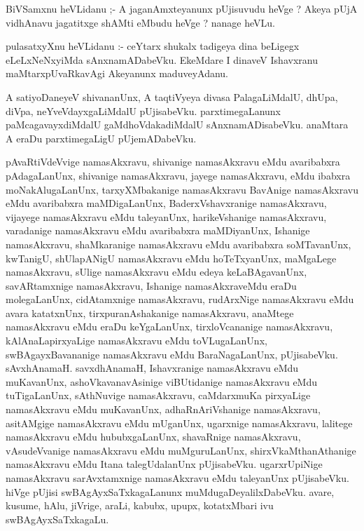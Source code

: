\documentclass{article}
\begin{document}
\begin{mn}
BiVSamxnu  heVLidanu ;- A  jaganAmxteyanunx  pUjisuvudu  heVge ?  Akeya  pUjA  vidhAnavu  jagatitxge  
shAMti  eMbudu  heVge ?  nanage  heVLu.
\end{mn}

\begin{mn}
pulasatxyXnu  heVLidanu :- ceYtarx  shukalx  tadigeya  dina  beLigegx  eLeLxNeNxyiMda  sAnxnamADabeVku.  
EkeMdare  I  dinaveV  Ishavxranu  maMtarxpUvaRkavAgi  Akeyanunx  maduveyAdanu.
\end{mn}

\begin{mn}
A  satiyoDaneyeV  shivananUnx,  A  taqtiVyeya  divasa  PalagaLiMdalU,  dhUpa,  diVpa,  
neYveVdayxgaLiMdalU  pUjisabeVku.  parxtimegaLanunx  paMcagavayxdiMdalU  gaMdhoVdakadiMdalU  
sAnxnamADisabeVku.  anaMtara  A  eraDu  parxtimegaLigU  pUjemADabeVku.
\end{mn}

\begin{mn}
pAvaRtiVdeVvige  namasAkxravu,  shivanige  namasAkxravu  eMdu  avaribabxra   pAdagaLanUnx,  
shivanige  namasAkxravu,  jayege  namasAkxravu,  eMdu  ibabxra  moNakAlugaLanUnx,  tarxyXMbakanige  
namasAkxravu  BavAnige  namasAkxravu  eMdu  avaribabxra  maMDigaLanUnx,  BaderxVshavxranige  
namasAkxravu,  vijayege  namasAkxravu  eMdu  taleyanUnx,  harikeVshanige  namasAkxravu,  varadanige  
namasAkxravu  eMdu  avaribabxra  maMDiyanUnx,  Ishanige  namasAkxravu,  shaMkaranige  namasAkxravu  
eMdu  avaribabxra  soMTavanUnx,  kwTanigU,  shUlapANigU  namasAkxravu  eMdu  hoTeTxyanUnx,  maMgaLege  
namasAkxravu,  sUlige  namasAkxravu  eMdu  edeya  keLaBAgavanUnx,  savARtamxnige  namasAkxravu,  
Ishanige  namasAkxraveMdu  eraDu  molegaLanUnx,  cidAtamxnige  namasAkxravu,  rudArxNige  namasAkxravu  
eMdu  avara  katatxnUnx,  tirxpuranAshakanige  namasAkxravu,  anaMtege  namasAkxravu  eMdu  eraDu  
keYgaLanUnx,  tirxloVcananige  namasAkxravu,  kAlAnaLapirxyaLige  namasAkxravu  eMdu  toVLugaLanUnx,  
swBAgayxBavananige  namasAkxravu  eMdu  BaraNagaLanUnx,  pUjisabeVku.  sAvxhAnamaH.  savxdhAnamaH,  
Ishavxranige  namasAkxravu  eMdu  muKavanUnx,  ashoVkavanavAsinige  viBUtidanige  namasAkxravu  eMdu  
tuTigaLanUnx,  sAthNuvige  namasAkxravu,  caMdarxmuKa  pirxyaLige  namasAkxravu  eMdu  muKavanUnx,  
adhaRnAriVshanige  namasAkxravu,  asitAMgige  namasAkxravu  eMdu  mUganUnx,  ugarxnige  namasAkxravu,  
lalitege  namasAkxravu  eMdu  hububxgaLanUnx,  shavaRnige  namasAkxravu,  vAsudeVvanige  namasAkxravu  
eMdu  muMguruLanUnx,  shirxVkaMthanAthanige  namasAkxravu  eMdu  Itana  talegUdalanUnx  pUjisabeVku.  
ugarxrUpiNige  namasAkxravu  sarAvxtamxnige  namasAkxravu  eMdu  taleyanUnx  pUjisabeVku.  hiVge  pUjisi  
swBAgAyxSaTxkagaLanunx  muMdugaDeyalilxDabeVku.  avare,  kusume,  hAlu,  jiVrige,  araLi,  kabubx,  upupx,  
kotatxMbari  ivu  swBAgAyxSaTxkagaLu.
\end{mn}
\end{document}
